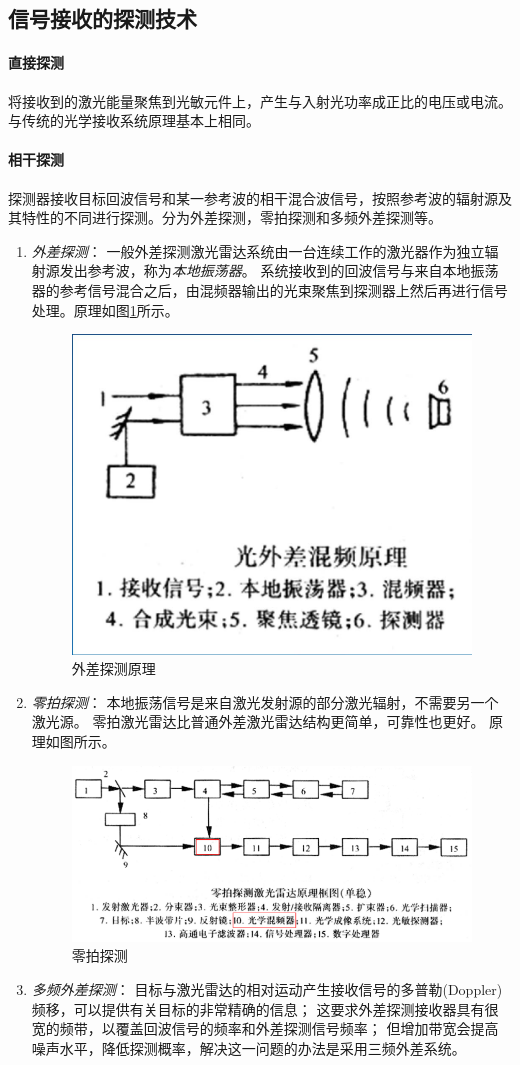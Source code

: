 \subsection{信号接收的探测技术} %
\paragraph{直接探测}将接收到的激光能量聚焦到光敏元件上，产生与入射光功率成正比的电压或电流。与传统的光学接收系统原理基本上相同。
\paragraph{相干探测}探测器接收目标回波信号和某一参考波的相干混合波信号，按照参考波的辐射源及其特性的不同进行探测。分为外差探测，零拍探测和多频外差探测等。
\begin{enumerate}
	\item \textit{外差探测}：
		一般外差探测激光雷达系统由一台连续工作的激光器作为独立辐射源发出参考波，称为\textit{本地振荡器}。
		系统接收到的回波信号与来自本地振荡器的参考信号混合之后，由混频器输出的光束聚焦到探测器上然后再进行信号处理。原理如图\ref{fig:外差探测}所示。
		\begin{figure}[htbp]
			\centering
			\includegraphics[width=0.4\linewidth]{figure/Chapter2/外差探测}
			\caption{外差探测原理}
			\label{fig:外差探测}
		\end{figure}
	\item \textit{零拍探测}：
		本地振荡信号是来自激光发射源的部分激光辐射，不需要另一个激光源。
		零拍激光雷达比普通外差激光雷达结构更简单，可靠性也更好。
		原理如图所示。
		\begin{figure}[htbp]
			\centering
			\includegraphics[width=0.7\linewidth]{figure/Chapter2/零拍探测}
			\caption{零拍探测}
			\label{fig:零拍探测}
		\end{figure}
	\item \textit{多频外差探测}：
		目标与激光雷达的相对运动产生接收信号的多普勒(Doppler)频移，可以提供有关目标的非常精确的信息；
		这要求外差探测接收器具有很宽的频带，以覆盖回波信号的频率和外差探测信号频率；
		但增加带宽会提高噪声水平，降低探测概率，解决这一问题的办法是采用三频外差系统。
		

\end{enumerate}
